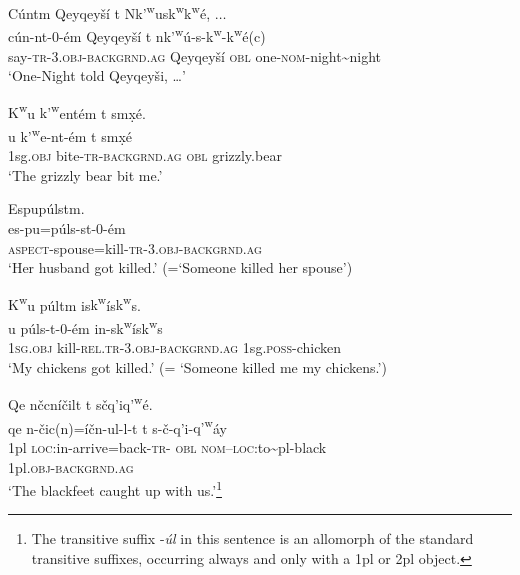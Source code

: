 \documentclass[output=paper,colorlinks,citecolor=brown]{langscibook}
\begin{document}
\ea 
\label{ex-thomason-18}
C\'untm Qeyqey\v{s}\'i t N{k'\textsuperscript w}us{k\textsuperscript w}{k\textsuperscript w}\textglotstop\'e, $\ldots$ \\
 \gll c\'un-nt-0-\'em Qeyqey\v{s}\'i t
n{k'\textsuperscript w}\'u\textglotstop-s-{k\textsuperscript w}-{k\textsuperscript w}\textglotstop\'e(c) \\
say-\textsc{tr}-3.\textsc{obj}-\textsc{backgrnd.ag} Qeyqey\v{s}\'i \textsc{obl} one-\textsc{nom}-night\textasciitilde{}night \\
 \glt `One-Night told Qeyqey\v{s}i,  \ldots '
 \z

\ea 
\label{ex-thomason-19}
{K\textsuperscript w}u {k'\textsuperscript w}e{\textglotstop}nt\'em t sm\d{x}\'e. \\
u {k'\textsuperscript
 w}e{\textglotstop}-nt-\'em t sm\d{x}\'e\\
1sg.\textsc{obj} bite-\textsc{tr}-\textsc{backgrnd.ag} \textsc{obl} grizzly.bear\\
\glt `The grizzly bear bit me.'
\z


\ea 
\label{ex-thomason-20}
Espu{\textglotstop}p\'ulstm.  \\
\gll es-pu\textglotstop=p\'uls-st-0-\'em \\
\textsc{aspect}-spouse=kill-\textsc{tr}-3.\textsc{obj}-\textsc{backgrnd.ag}\\
\glt `Her husband got killed.' (=`Someone killed her spouse')
\z

\ea 
\label{ex-thomason-21}
{K\textsuperscript w}u p\'ul{\textltilde}tm is{k\textsuperscript w}\'is{k\textsuperscript w}s. \\
u p\'uls-{\textltilde}t-0-\'em
in-s{k\textsuperscript w}\'is{k\textsuperscript w}s\\
\textsc{1sg.obj} kill-\textsc{rel.tr}-3.\textsc{obj}-\textsc{backgrnd.ag} 1sg.\textsc{poss}-chicken\\
\glt `My chickens got killed.' (= `Someone killed me my chickens.')
\z

\ea 
\label{ex-thomason-22}
Qe n\v{c}cn\'i\v{c}i{\textltilde}lt t s\v{c}q'i{q'\textsuperscript w}\'e.  \\
 \gll qe n-\v{c}ic(n)=\'i\v{c}n-{\textltilde}ul-l-t t
s-\v{c}-q'i-{q'\textsuperscript w}\'ay\\
1pl \textsc{loc}:in-arrive=back-\textsc{tr}-
\textsc{obl} \textsc{nom}--\textsc{loc}:to\textasciitilde{}pl-black\\
1pl.\textsc{obj}-\textsc{backgrnd.ag}\\
 \glt `The blackfeet caught up with
us.'\footnote{The transitive suffix -\emph{{\textltilde}\'ul} in this
sentence is an allomorph of the standard transitive suffixes,
occurring always and only with a 1pl or 2pl object.}
\z
\end{document}
